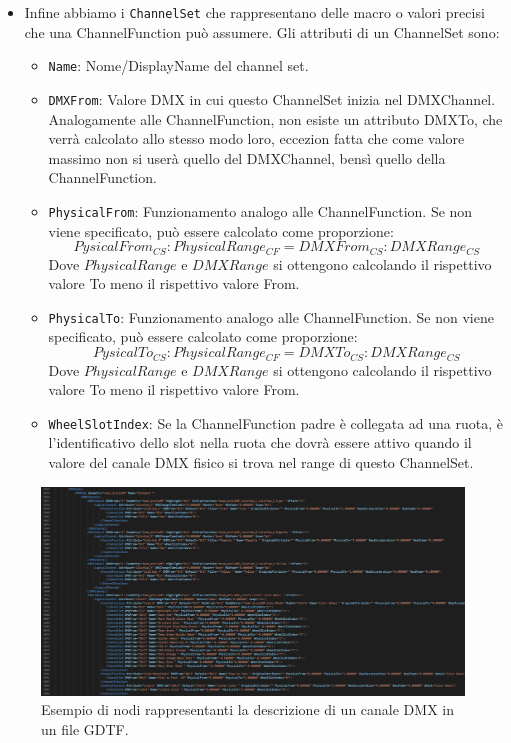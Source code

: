 \documentclass[main.tex]{subfiles}
\begin{document}
\begin{itemize}
\begin{itemize}
        \end{itemize}
    \item Infine abbiamo i \lstinline{ChannelSet} che rappresentano delle macro o valori precisi che una ChannelFunction può assumere. Gli attributi di un ChannelSet sono: \begin{itemize}
            \item \lstinline{Name}: Nome/DisplayName del channel set.
            \item \lstinline{DMXFrom}: Valore DMX in cui questo ChannelSet inizia nel DMXChannel. Analogamente alle ChannelFunction, non esiste un attributo DMXTo, che verrà calcolato allo stesso modo loro, eccezion fatta che come valore massimo non si userà quello del DMXChannel, bensì quello della ChannelFunction. 
            \item \lstinline{PhysicalFrom}: Funzionamento analogo alle ChannelFunction. Se non viene specificato, può essere calcolato come proporzione:
            \[PysicalFrom_{CS} : PhysicalRange_{CF} = DMXFrom_{CS} : DMXRange_{CS}\]
            Dove $PhysicalRange$ e $DMXRange$ si ottengono calcolando il rispettivo valore To meno il rispettivo valore From.
            \item \lstinline{PhysicalTo}: Funzionamento analogo alle ChannelFunction. Se non viene specificato, può essere calcolato come proporzione:
            \[PysicalTo_{CS} : PhysicalRange_{CF} = DMXTo_{CS} : DMXRange_{CS}\]
            Dove $PhysicalRange$ e $DMXRange$ si ottengono calcolando il rispettivo valore To meno il rispettivo valore From.
            \item \lstinline{WheelSlotIndex}: Se la ChannelFunction padre è collegata ad una ruota, è l'identificativo dello slot nella ruota che dovrà essere attivo quando il valore del canale DMX fisico si trova nel range di questo ChannelSet.
        \end{itemize}
\end{itemize}
\begin{figure}[H]
    \centering
    \includegraphics[width=1\linewidth]{img/introduzione/GDTFdmxExample.jpg}
    \caption{Esempio di nodi rappresentanti la descrizione di un canale DMX in un file GDTF.}
    \label{fig:1_gdtfDmxExample}
\end{figure}
\end{document}
